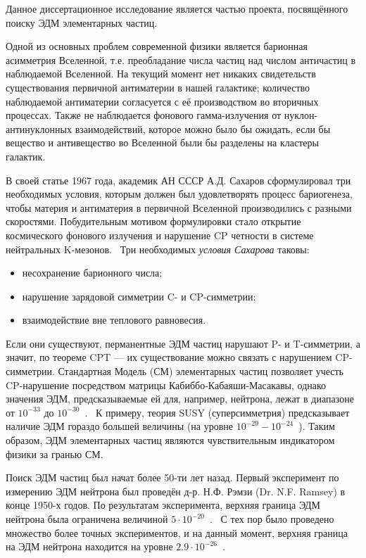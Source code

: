 
{\actuality} 
Данное диссертационное исследование является частью проекта, посвящённого поиску ЭДМ элементарных частиц.

Одной из основных проблем современной физики является барионная асимметрия Вселенной, т.е. преобладание числа частиц над числом античастиц в наблюдаемой Вселенной. На текущий момент нет никаких свидетельств существования первичной антиматерии в нашей галактике; количество наблюдаемой антиматерии согласуется с её производством во вторичных процессах. Также не наблюдается фонового гамма-излучения от нуклон-антинуклонных взаимодействий, которое можно было бы ожидать, если бы вещество и антивещество во Вселенной были бы разделены на кластеры галактик.~\cite{Trodden:Baryogenesis} 

В своей статье 1967 года, академик АН СССР А.Д. Сахаров сформулировал три необходимых условия, которым должен был удовлетворять процесс бариогенеза, чтобы материя и антиматерия в первичной Вселенной производились с разными скоростями. Побудительным мотивом формулировки стало открытие космического фонового излучения и нарушение CP четности в системе нейтральных K-мезонов.~\cite{Fitch:Kaon-CP-violation-1964} Три необходимых \emph{условия Сахарова} таковы:
\begin{itemize}
	\item несохранение барионного числа;
	\item нарушение зарядовой симметрии C- и CP-симметрии;
	\item взаимодействие вне теплового равновесия.
\end{itemize}

Если они существуют, перманентные ЭДМ частиц нарушают P- и T-симметрии, а значит, по теореме CPT --- их существование можно связать с нарушением CP-симметрии. Стандартная Модель (СМ) элементарных частиц позволяет учесть CP-нарушение посредством матрицы Кабиббо-Кабаяши-Масакавы, однако значения ЭДМ, предсказываемые ей для, например, нейтрона, лежат в диапазоне от $10^{-33}$ до $10^{-30}$~\ecm.~\cite{Harris:Neutron2007} К примеру, теория SUSY (суперсимметрия) предсказывает наличие ЭДМ гораздо большей величины (на уровне ${10^{-29} - 10^{-24}}$~\ecm). Таким образом, ЭДМ элементарных частиц являются чувствительным индикатором физики за гранью СМ. 

Поиск ЭДМ частиц был начат более 50-ти лет назад. Первый эксперимент по измерению ЭДМ нейтрона был проведён д-р. Н.Ф. Рэмзи (Dr. N.F. Ramsey) в конце 1950-х годов. По результатам эксперимента, верхняя граница ЭДМ нейтрона была ограничена величиной ${5\cdot 10^{-20}}$~\ecm.~\cite{Ramsey:Neutron1957} С тех пор было проведено множество более точных экспериментов, и на данный момент, верхняя граница на ЭДМ нейтрона находится на уровне ${2.9\cdot 10^{-26}}$~\ecm.~\cite{Baker:nEDM:Main, Baker:nEDM:Reply}

